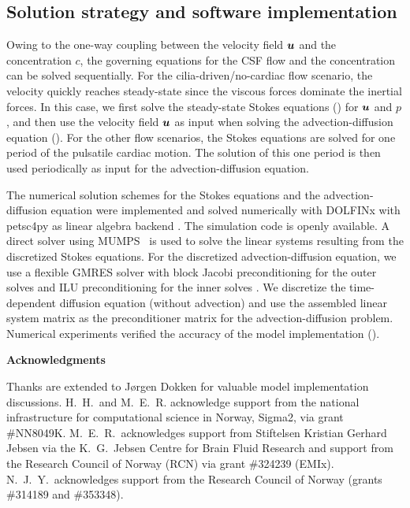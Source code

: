 \documentclass{WileyMSP-template}
\begin{document}
\subsection{Solution strategy and software implementation}
Owing to the one-way coupling between the velocity field $\bm{u}$
and the concentration $c$, the governing equations for the
CSF flow and the concentration can be solved sequentially.
For the cilia-driven/no-cardiac flow scenario, the velocity quickly reaches steady-state since
the viscous forces dominate the inertial forces.
In this case, we first solve the steady-state Stokes equations ()
for $\bm{u}$ and $p$, and then use the velocity field $\bm{u}$ as input when solving
the advection-diffusion equation ().
For the other flow scenarios, the Stokes equations are solved for one
period of the pulsatile cardiac motion. The solution of this one period
is then used periodically as input for the advection-diffusion equation.

The numerical solution schemes for the Stokes equations and the
advection-diffusion equation were implemented and solved numerically with
DOLFINx with petsc4py as linear algebra backend
\cite{dolfinx2023preprint, Dalcin2011ParallelPython}.
The simulation code is openly
available.
A direct solver using MUMPS~\cite{Amestoy2011Mumps} is used to solve the
linear systems resulting from the discretized Stokes equations.
For the discretized advection-diffusion equation, we use a flexible GMRES solver
with block Jacobi preconditioning for the outer solves
and ILU preconditioning for the inner solves
\cite{fgmres, Jacobi1845UeberGleichungen, chan1997approximate}. 
We discretize the time-dependent diffusion equation (without advection)
and use the assembled linear system matrix
as the preconditioner matrix for the advection-diffusion problem.
Numerical experiments verified the accuracy of the model implementation
(). 


\medskip
\noindent \textbf{Acknowledgments} \par
\noindent Thanks are extended to J\o rgen Dokken
for valuable model implementation discussions.  H.~H.~and
M.~E.~R. acknowledge support from the national infrastructure for
computational science in Norway, Sigma2, via grant
\#NN8049K. M.~E.~R.~acknowledges support from Stiftelsen Kristian
Gerhard Jebsen via the K.~G.~Jebsen Centre for Brain Fluid Research
and support from the Research Council of Norway (RCN) via grant
\#324239 (EMIx). N.~J.~Y.~acknowledges support from the Research
Council of Norway (grants \#314189 and \#353348).
\end{document}
